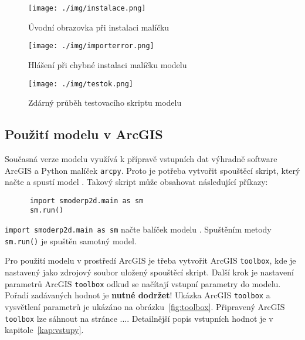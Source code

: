   \begin{figure}[t!]
    \centering
    \texttt{[image: ./img/instalace.png]}
    \caption{Úvodní obrazovka při instalaci malíčku \smod}
    \label{fig:pruvodce}
  \end{figure}
% 
  \begin{figure}[b!]
    \centering
    \texttt{[image: ./img/importerror.png]}
    \caption{Hlášení při chybné instalaci malíčku modelu \smod}
    \label{fig:importerror}
  \end{figure}
% 
  \begin{figure}[t!]
    \centering
    \texttt{[image: ./img/testok.png]}
    \caption{Zdárný průběh testovacího skriptu modelu}
    \label{fig:testok}
  \end{figure}
  
\subsection{Použití modelu v ArcGIS}
  
  Současná verze modelu \smod využívá k přípravě vstupních dat výhradně software ArcGIS a Python malíček {\tt arcpy}. Proto je potřeba vytvořit spouštěcí skript, který načte a spustí model \smod. Takový skript může obsahovat následující příkazy:
    \begin{lstlisting}
      import smoderp2d.main as sm
      sm.run()
    \end{lstlisting}
  {\tt import smoderp2d.main as sm}  načte balíček modelu \smod. Spuštěním metody  {\tt sm.run()} je spuštěn samotný model. 
  
  Pro použití modelu v prostředí ArcGIS je třeba vytvořit ArcGIS {\tt toolbox}, kde je nastavený jako zdrojový soubor  uložený spouštěcí skript. Další krok je nastavení parametrů ArcGIS {\tt toolbox} odkud se načítají vstupní parametry do modelu. Pořadí zadávaných hodnot je {\bf nutné dodržet}! Ukázka ArcGIS {\tt toolbox} a vysvětlení parametrů je ukázáno na obrázku~\ref{fig:toolbox}. Připravený ArcGIS {\tt toolbox} lze sáhnout na stránce .... Detailnější popis vstupních hodnot je v kapitole~\ref{kap:vstupy}.
  
  
  
